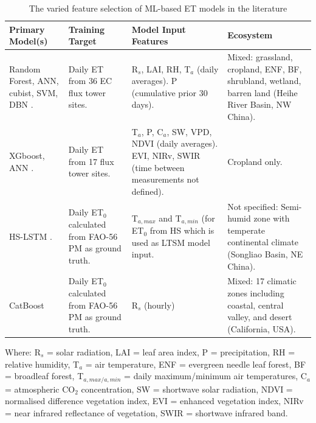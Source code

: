 \documentclass[paper=a4,fontsize=12pt]{scrartcl}
\begin{document}
\newpage
{}
	\begin{table}[H]
		\centering
		\caption{The varied feature selection of ML-based ET models in the literature}
		\label{tab:ml_models}
		\begin{tabularx}{\linewidth}{X | X | X | X} 
			\hline \hline
			\textbf{Primary Model(s)} & \textbf{Training Target} & \textbf{Model Input Features} & \textbf{Ecosystem}\\ \hline
			
			Random Forest, ANN, cubist, SVM, DBN \newline \parencite{xu2018evaluating}. & Daily ET from 36 EC flux tower sites. & R$_s$, LAI, RH, T$_a$ (daily averages). \newline P (cumulative prior 30 days).  & Mixed: grassland, cropland, ENF, BF, shrubland, wetland, barren land (Heihe River Basin, NW China).\\
			
			
			\hline
			
			
			XGboost, ANN \newline \parencite{liu2021assessment}. & Daily ET from 17 flux tower sites. & T$_a$, P, C$_a$, SW, VPD, NDVI (daily averages). \newline EVI, NIRv, SWIR (time between measurements not defined). & Cropland only. \\
			
			
			\hline 

			
			HS-LSTM \newline \parencite{yan2023deep}. & Daily ET$_0$ calculated from FAO-56 PM as ground truth. & T$_{a,max}$ and T$_{a,min}$ (for ET$_0$ from HS which is used as LTSM model input. & Not specified: Semi-humid zone with temperate continental climate (Songliao Basin, NE China).\\
			
			\hline
			
			
			CatBoost \newline \parencite{ahmadi2024solaret} & Daily ET$_0$ calculated from FAO-56 PM as ground truth. & R$_s$ (hourly) & Mixed: 17 climatic zones including coastal, central valley, and desert (California, USA). \\
			
			\hline \hline
		\end{tabularx}  
	\end{table}
	\noindent Where: R$_s$ = solar radiation, LAI = leaf area index, P = precipitation, RH = relative humidity, T$_a$ = air temperature, ENF = evergreen needle leaf forest, BF = broadleaf forest, T$_{a,max/a,min}$ = daily maximum/minimum air temperatures, C$_a$ = atmospheric CO$_2$ concentration, SW = shortwave solar radiation, NDVI = normalised difference vegetation index, EVI = enhanced vegetation index, NIRv = near infrared reflectance of vegetation, SWIR = shortwave infrared band.
\restoregeometry
\newpage
\end{document}
